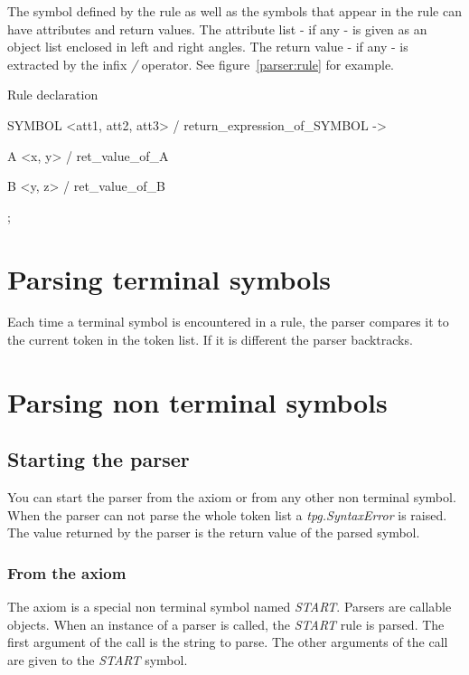 The symbol defined by the rule as well as the symbols that appear in the rule can have attributes and return values.
The attribute list - if any - is given as an object list enclosed in left and right angles.
The return value - if any - is extracted by the infix \emph{/} operator.
See figure~\ref{parser:rule} for example.

\begin{code}
\caption{Rule declaration} \label{parser:rule}
\begin{verbatimtab}[4]
	SYMBOL <att1, att2, att3> / return_expression_of_SYMBOL ->

		A <x, y> / ret_value_of_A

		B <y, z> / ret_value_of_B

		;
\end{verbatimtab}
\end{code}

\section{Parsing terminal symbols}

Each time a terminal symbol is encountered in a rule, the parser compares it to the current token in the token list. If it is different the parser backtracks.

\section{Parsing non terminal symbols}
\label{parser:nterm}

\subsection{Starting the parser}

You can start the parser from the axiom or from any other non terminal symbol.
When the parser can not parse the whole token list a \emph{tpg.SyntaxError} is raised.
The value returned by the parser is the return value of the parsed symbol.

\subsubsection{From the axiom}

The axiom is a special non terminal symbol named \emph{START}.
Parsers are callable objects.
When an instance of a parser is called, the \emph{START} rule is parsed.
The first argument of the call is the string to parse.
The other arguments of the call are given to the \emph{START} symbol.

